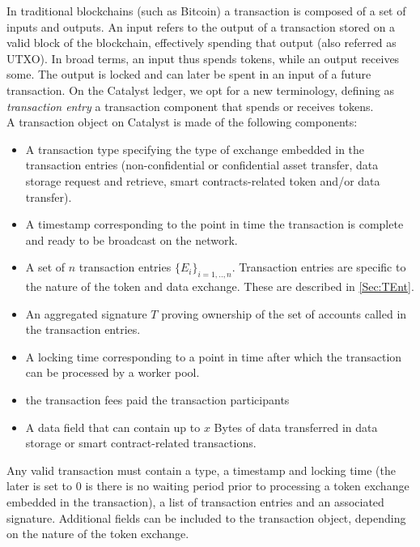 In traditional blockchains (such as Bitcoin) a transaction is composed of a set of inputs and outputs. An input refers to the output of a transaction stored on a valid block of the blockchain, effectively spending that output (also referred as UTXO). In broad terms, an input thus spends tokens, while an output receives some. The output is locked and can later be spent in an input of a future transaction. On the Catalyst ledger, we opt for a new terminology, defining as \textit{transaction entry} a transaction component that spends or receives tokens.\\

A transaction object on Catalyst is made of the following components:

\begin{itemize}
\item A transaction type specifying the type of exchange embedded in the transaction entries (non-confidential or confidential asset transfer, data storage request and retrieve, smart contracts-related token and/or data transfer).      
\item A timestamp corresponding to the point in time the transaction is complete and ready to be broadcast on the network.
\item A set of $n$ transaction entries $\{E_i\}_{i=1,..,n}$. Transaction entries are specific to the nature of the token and data exchange. These are described in \ref{Sec:TEnt}.
\item An aggregated signature $T$ proving ownership of the set of accounts called in the transaction entries.
\item A locking time corresponding to a point in time after which the transaction can be processed by a worker pool.
\item the transaction fees paid the transaction participants
\item A data field that can contain up to $x$ Bytes of data transferred in data storage or smart contract-related transactions. 
\end{itemize}

Any valid transaction must contain a type, a timestamp and locking time (the later is set to 0 is there is no waiting period prior to processing a token exchange embedded in the transaction), a list of transaction entries and an associated signature. Additional fields can be included to the transaction object, depending on the nature of the token exchange. 